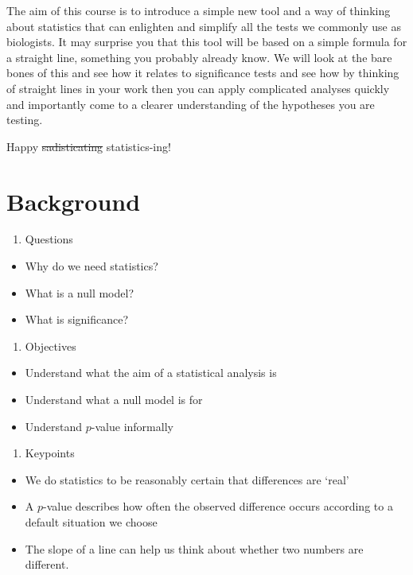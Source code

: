 \documentclass[
]{book}
\providecommand{\tightlist}{%
  \setlength{\itemsep}{0pt}\setlength{\parskip}{0pt}}
\begin{document}
The aim of this course is to introduce a simple new tool and a way of thinking about statistics that can enlighten and simplify all the tests we commonly use as biologists. It may surprise you that this tool will be based on a simple formula for a straight line, something you probably already know. We will look at the bare bones of this and see how it relates to significance tests and see how by thinking of straight lines in your work then you can apply complicated analyses quickly and importantly come to a clearer understanding of the hypotheses you are testing.

Happy \sout{sadisticating} statistics-ing!

\hypertarget{background}{%
\chapter{Background}\label{background}}

\begin{enumerate}
\def\labelenumi{\arabic{enumi}.}
\tightlist
\item
  Questions
\end{enumerate}

\begin{itemize}
\tightlist
\item
  Why do we need statistics?
\item
  What is a null model?
\item
  What is significance?
\end{itemize}

\begin{enumerate}
\def\labelenumi{\arabic{enumi}.}
\setcounter{enumi}{1}
\tightlist
\item
  Objectives
\end{enumerate}

\begin{itemize}
\tightlist
\item
  Understand what the aim of a statistical analysis is
\item
  Understand what a null model is for
\item
  Understand \(p\)-value informally
\end{itemize}

\begin{enumerate}
\def\labelenumi{\arabic{enumi}.}
\setcounter{enumi}{2}
\tightlist
\item
  Keypoints
\end{enumerate}

\begin{itemize}
\tightlist
\item
  We do statistics to be reasonably certain that differences are `real'
\item
  A \(p\)-value describes how often the observed difference occurs according to a default situation we choose
\item
  The slope of a line can help us think about whether two numbers are different.
\end{itemize}
\end{document}
